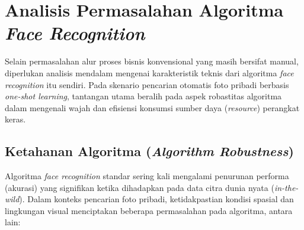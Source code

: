 \section{Analisis Permasalahan Algoritma \textit{Face Recognition}}

Selain permasalahan alur proses bisnis konvensional yang masih bersifat manual, diperlukan analisis mendalam mengenai karakteristik teknis dari algoritma \textit{face recognition} itu sendiri. Pada skenario pencarian otomatis foto pribadi berbasis \textit{one-shot learning}, tantangan utama beralih pada aspek robastitas algoritma dalam mengenali wajah dan efisiensi konsumsi sumber daya (\textit{resource}) perangkat keras.

\subsection{Ketahanan Algoritma (\textit{Algorithm Robustness})}

Algoritma \textit{face recognition} standar sering kali mengalami penurunan performa (akurasi) yang signifikan ketika dihadapkan pada data citra dunia nyata (\textit{in-the-wild}). Dalam konteks pencarian foto pribadi, ketidakpastian kondisi spasial dan lingkungan visual menciptakan beberapa permasalahan pada algoritma, antara lain:


